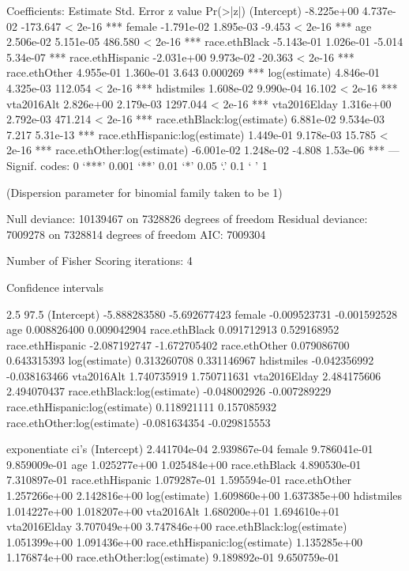 Coefficients:
                                 Estimate Std. Error  z value Pr(>|z|)
(Intercept)                    -8.225e+00  4.737e-02 -173.647  < 2e-16 ***
female                         -1.791e-02  1.895e-03   -9.453  < 2e-16 ***
age                             2.506e-02  5.151e-05  486.580  < 2e-16 ***
race.ethBlack                  -5.143e-01  1.026e-01   -5.014 5.34e-07 ***
race.ethHispanic               -2.031e+00  9.973e-02  -20.363  < 2e-16 ***
race.ethOther                   4.955e-01  1.360e-01    3.643 0.000269 ***
log(estimate)                   4.846e-01  4.325e-03  112.054  < 2e-16 ***
hdistmiles                      1.608e-02  9.990e-04   16.102  < 2e-16 ***
vta2016Alt                      2.826e+00  2.179e-03 1297.044  < 2e-16 ***
vta2016Elday                    1.316e+00  2.792e-03  471.214  < 2e-16 ***
race.ethBlack:log(estimate)     6.881e-02  9.534e-03    7.217 5.31e-13 ***
race.ethHispanic:log(estimate)  1.449e-01  9.178e-03   15.785  < 2e-16 ***
race.ethOther:log(estimate)    -6.001e-02  1.248e-02   -4.808 1.53e-06 ***
---
Signif. codes:  0 ‘***’ 0.001 ‘**’ 0.01 ‘*’ 0.05 ‘.’ 0.1 ‘ ’ 1

(Dispersion parameter for binomial family taken to be 1)

    Null deviance: 10139467  on 7328826  degrees of freedom
Residual deviance:  7009278  on 7328814  degrees of freedom
AIC: 7009304

Number of Fisher Scoring iterations: 4


Confidence intervals

                                    2.5        97.5 %
(Intercept)                    -5.888283580 -5.692677423
female                         -0.009523731 -0.001592528
age                             0.008826400  0.009042904
race.ethBlack                   0.091712913  0.529168952
race.ethHispanic               -2.087192747 -1.672705402
race.ethOther                   0.079086700  0.643315393
log(estimate)                   0.313260708  0.331146967
hdistmiles                     -0.042356992 -0.038163466
vta2016Alt                      1.740735919  1.750711631
vta2016Elday                    2.484175606  2.494070437
race.ethBlack:log(estimate)    -0.048002926 -0.007289229
race.ethHispanic:log(estimate)  0.118921111  0.157085932
race.ethOther:log(estimate)    -0.081634354 -0.029815553

exponentiate ci's
(Intercept)                    2.441704e-04 2.939867e-04
female                         9.786041e-01 9.859009e-01
age                            1.025277e+00 1.025484e+00
race.ethBlack                  4.890530e-01 7.310897e-01
race.ethHispanic               1.079287e-01 1.595594e-01
race.ethOther                  1.257266e+00 2.142816e+00
log(estimate)                  1.609860e+00 1.637385e+00
hdistmiles                     1.014227e+00 1.018207e+00
vta2016Alt                     1.680200e+01 1.694610e+01
vta2016Elday                   3.707049e+00 3.747846e+00
race.ethBlack:log(estimate)    1.051399e+00 1.091436e+00
race.ethHispanic:log(estimate) 1.135285e+00 1.176874e+00
race.ethOther:log(estimate)    9.189892e-01 9.650759e-01
